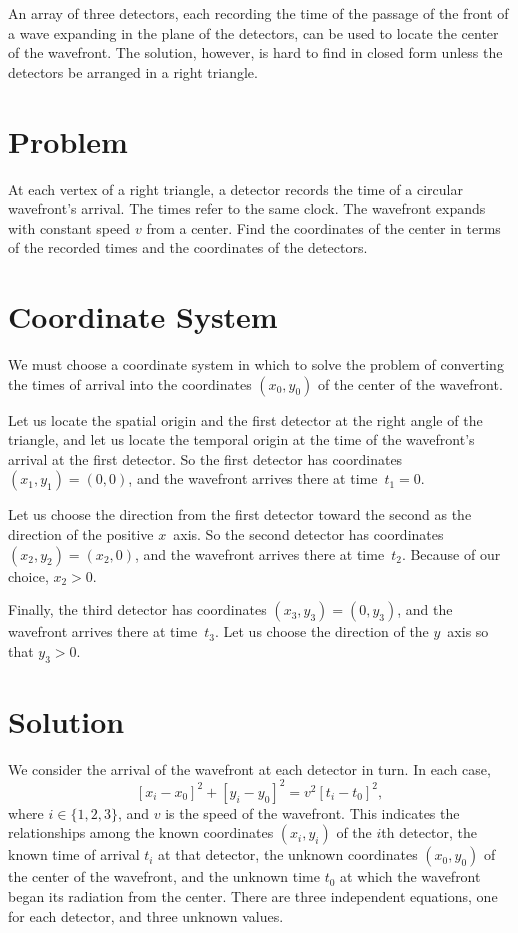 \documentclass[twocolumn]{article}
\begin{document}
An array of three detectors, each recording the time of the passage of the
front of a wave expanding in the plane of the detectors, can be used to locate
the center of the wavefront.  The solution, however, is hard to find in closed
form unless the detectors be arranged in a right triangle.

\section{Problem}

At each vertex of a right triangle, a detector records the time of a circular
wavefront's arrival.  The times refer to the same clock.  The wavefront expands
with constant speed $v$ from a center.  Find the coordinates of the center in
terms of the recorded times and the coordinates of the detectors.

\section{Coordinate System}

We must choose a coordinate system in which to solve the problem of converting
the times of arrival into the coordinates $(x_0, y_0)$ of the center of the
wavefront.

Let us locate the spatial origin and the first detector at the right angle of
the triangle, and let us locate the temporal origin at the time of the
wavefront's arrival at the first detector.  So the first detector has
coordinates $(x_1, y_1) = (0, 0)$, and the wavefront arrives there at time~$t_1
= 0$.

Let us choose the direction from the first detector toward the second
as the direction of the positive $x$~axis.  So the second detector has
coordinates $(x_2, y_2) = (x_2, 0)$, and the wavefront arrives there at
time~$t_2$.  Because of our choice, $x_2 > 0$.

Finally, the third detector has coordinates $(x_3, y_3) = (0, y_3)$, and the
wavefront arrives there at time~$t_3$.  Let us choose the direction of the
$y$~axis so that $y_3 > 0$.

\section{Solution}

We consider the arrival of the wavefront at each detector in turn.  In each
case,
\begin{equation}
   \left[x_i - x_0\right]^2 + \left[y_i - y_0\right]^2 = v^2 \left[t_i -
   t_0\right]^2,
\end{equation}
where $i \in \{1, 2, 3\}$, and $v$ is the speed of the wavefront.  This
indicates the relationships among the known coordinates $(x_i, y_i)$ of the
$i$th detector, the known time of arrival $t_i$ at that detector, the unknown
coordinates $(x_0, y_0)$ of the center of the wavefront, and the unknown time
$t_0$ at which the wavefront began its radiation from the center.  There are
three independent equations, one for each detector, and three unknown values.
\end{document}
